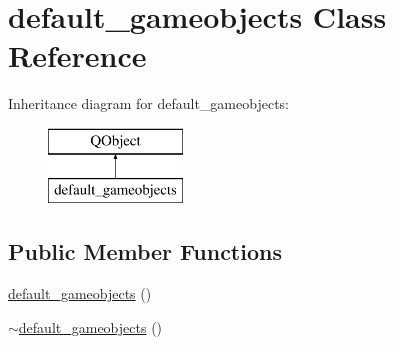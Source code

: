 \hypertarget{classdefault__gameobjects}{\section{default\-\_\-gameobjects Class Reference}
\label{classdefault__gameobjects}
}
Inheritance diagram for default\-\_\-gameobjects\-:\begin{figure}[H]
\begin{center}
\leavevmode
\includegraphics[height=2.000000cm]{classdefault__gameobjects}
\end{center}
\end{figure}
\subsection*{Public Member Functions}
\begin{DoxyCompactItemize}
\item 
\hyperlink{classdefault__gameobjects_a22d600cef773dfca6c6f3eca61d5ea10}{default\-\_\-gameobjects} ()
\item 
\hyperlink{classdefault__gameobjects_a384c1eb52e64799bc9a8416bc9e4c8af}{$\sim$default\-\_\-gameobjects} ()
\end{DoxyCompactItemize}
